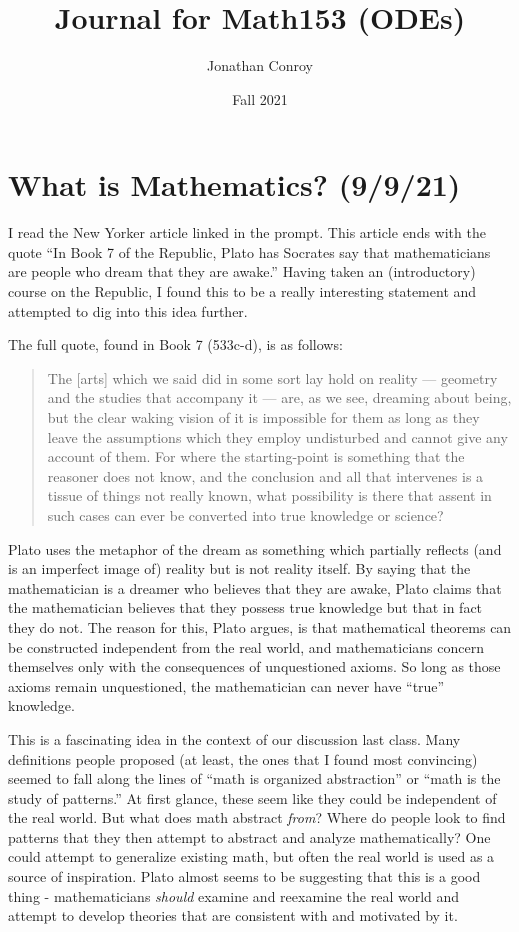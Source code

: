 \documentclass[12pt]{article}
\title{Journal for Math153 (ODEs)}
\author{Jonathan Conroy}
\date{Fall 2021}
\begin{document}
\maketitle
\tableofcontents
\newpage
\section{What is Mathematics? (9/9/21)}
I read the New Yorker article linked in the prompt. This article ends with the quote ``In Book 7 of the Republic, Plato has Socrates say that mathematicians are people who dream that they are awake.'' Having taken an (introductory) course on the Republic, I found this to be a really interesting statement and attempted to dig into this idea further.

The full quote, found in Book 7 (533c-d), is as follows:
\begin{quote}
The [arts] which we said did in some sort lay hold on reality — geometry and the studies that accompany it — are, as we see, dreaming about being, but the clear waking vision of it is impossible for them as long as they leave the assumptions which they employ undisturbed and cannot give any account of them. For where the starting-point is something that the reasoner does not know, and the conclusion and all that intervenes is a tissue of things not really known, what possibility is there that assent in such cases can ever be converted into true knowledge or science?
\end{quote}

Plato uses the metaphor of the dream as something which partially reflects (and is an imperfect image of) reality but is not reality itself. By saying that the mathematician is a dreamer who believes that they are awake, Plato claims that the mathematician believes that they possess true knowledge but that in fact they do not. The reason for this, Plato argues, is that mathematical theorems can be constructed independent from the real world, and mathematicians concern themselves only with the consequences of unquestioned axioms. So long as those axioms remain unquestioned, the mathematician can never have ``true'' knowledge.

This is a fascinating idea in the context of our discussion last class. Many definitions people proposed (at least, the ones that I found most convincing) seemed to fall along the lines of ``math is organized abstraction'' or ``math is the study of patterns.'' At first glance, these seem like they could be independent of the real world. But what does math abstract \textit{from}? Where do people look to find patterns that they then attempt to abstract and analyze mathematically? One could attempt to generalize existing math, but often the real world is used as a source of inspiration. Plato almost seems to be suggesting that this is a good thing - mathematicians \textit{should} examine and reexamine the real world and attempt to develop theories that are consistent with and motivated by it.
\end{document}
